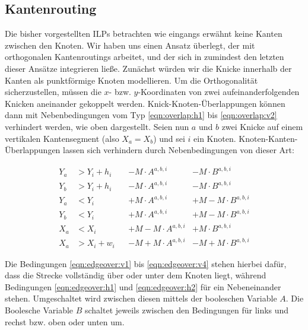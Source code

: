 \subsection{Kantenrouting}
\label{sub:edgeroute}

Die bisher vorgestellten ILPs betrachten wie eingangs erwähnt keine Kanten zwischen den Knoten. Wir haben uns einen Ansatz überlegt, der mit orthogonalen Kantenroutings arbeitet, und der sich in zumindest den letzten dieser Ansätze integrieren ließe. Zunächst würden wir die Knicke innerhalb der Kanten als punktförmige Knoten modellieren. Um die Orthogonalität sicherzustellen, müssen die $x$- bzw. $y$-Koordinaten von zwei aufeinanderfolgenden Knicken aneinander gekoppelt werden. Knick-Knoten-Überlappungen können dann mit Nebenbedingungen vom Typ \ref{eqn:overlap:h1} bis \ref{eqn:overlap:v2} verhindert werden, wie oben dargestellt. Seien nun $a$ und $b$ zwei Knicke auf einem vertikalen Kantensegment (also $X_a = X_b$) und sei $i$ ein Knoten. Knoten-Kanten-Überlappungen lassen sich verhindern durch Nebenbedingungen von dieser Art:

\begin{align}
	Y_a &> Y_{i} + h_i &&- M \cdot A^{a,b,i} & - M \cdot B^{a,b,i} \label{eqn:edgeover:v1} \\
	Y_b &> Y_{i} + h_i &&- M \cdot A^{a,b,i} & - M \cdot B^{a,b,i} \label{eqn:edgeover:v2}\\
	Y_a &< Y_{i}  &&+ M \cdot A^{a,b,i} & + M - M \cdot B^{a,b,i} \label{eqn:edgeover:v3}\\
	Y_b &< Y_{i}  &&+ M \cdot A^{a,b,i} & + M - M \cdot B^{a,b,i} \label{eqn:edgeover:v4}\\
	X_a &< X_i &&+ M - M \cdot A^{a,b,i} & + M \cdot B^{a,b,i} \label{eqn:edgeover:h1}\\
	X_a &> X_i + w_i &&- M + M \cdot A^{a,b,i} & -M + M \cdot B^{a,b,i} \label{eqn:edgeover:h2}
\end{align}

Die Bedingungen \ref{eqn:edgeover:v1} bis \ref{eqn:edgeover:v4} stehen hierbei dafür, dass die Strecke vollständig über oder unter dem Knoten liegt, während Bedingungen \ref{eqn:edgeover:h1} und \ref{eqn:edgeover:h2} für ein Nebeneinander stehen. Umgeschaltet wird zwischen diesen mittels der booleschen Variable $A$. Die Boolesche Variable $B$ schaltet jeweils zwischen den Bedingungen für links und rechst bzw. oben oder unten um.

